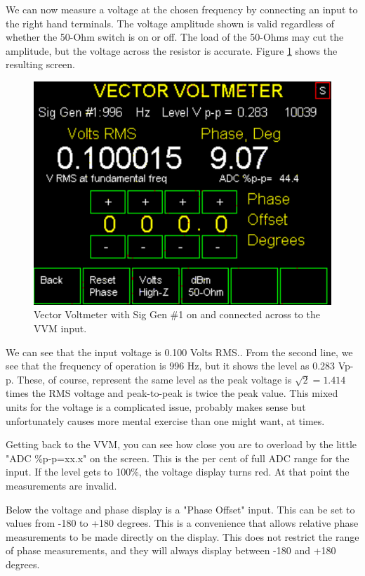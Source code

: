 We can now measure a voltage at the chosen frequency by connecting an input to the right hand terminals.  The voltage amplitude shown is valid regardless of whether the 50-Ohm switch is on or off.  The load of the 50-Ohms may cut the amplitude, but the voltage across the resistor is accurate.  Figure  \ref{AVNA_016-label} shows the resulting screen.
%
\begin{figure}[H]
\begin{center}
\includegraphics[scale=0.75]{./images/AVNA_016.pdf}
\caption{Vector Voltmeter with Sig Gen \#1 on and connected across to the VVM input.}
\label{AVNA_016-label}
\end{center}
\end{figure}
%
We can see that the input voltage is 0.100 Volts RMS..  From the second line, we see that the frequency of operation is 996 Hz, but it shows the level as 0.283 Vp-p.  These, of course, represent the same level  as the peak voltage is $\sqrt{2} = 1.414$ times the RMS voltage and peak-to-peak is twice the peak value.   This mixed units for the voltage is a complicated issue, probably makes sense but unfortunately causes more mental exercise than one might want, at times.

 Getting back to the VVM, you can see how close you are to overload by the little "ADC \%p-p=xx.x" on the screen.  This is the per cent of full ADC range for  the input.  If the level gets to 100\%, the voltage display turns red.  At that point the measurements are invalid.

Below the voltage and phase display is a "Phase Offset" input.  This can be set to values from -180 to +180 degrees.  This is a convenience that allows relative phase measurements to be made directly on the display.  This does not restrict the range of phase measurements, and they will always display between -180 and +180 degrees.


